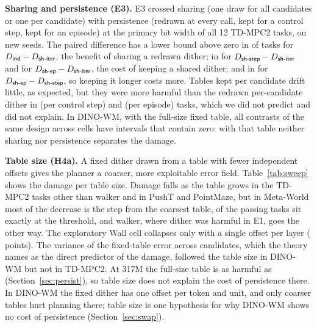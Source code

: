 \textbf{Sharing and persistence (E3).} E3 crossed sharing (one draw for all candidates or one per candidate) with persistence (redrawn at every call, kept for a control step, kept for an episode) at the primary bit width of all 12 TD-MPC2 tasks, on new seeds. The paired difference has a lower bound above zero in  of  tasks for $D_{\textsf{ind}}-D_{\textsf{sh-iter}}$, the benefit of sharing a redrawn dither; in  for $D_{\textsf{sh-step}}-D_{\textsf{sh-iter}}$ and  for $D_{\textsf{sh-ep}}-D_{\textsf{sh-iter}}$, the cost of keeping a shared dither; and in  for $D_{\textsf{sh-ep}}-D_{\textsf{sh-step}}$, so keeping it longer costs more. Tables kept per candidate drift little, as expected, but they were more harmful than the redrawn per-candidate dither in  (per control step) and  (per episode) tasks, which we did not predict and did not explain. In DINO-WM, with the full-size fixed table, all  contrasts of the same design across  cells have intervals that contain zero: with that table neither sharing nor persistence separates the damage.

\textbf{Table size (H4a).} A fixed dither drawn from a table with fewer independent offsets gives the planner a coarser, more exploitable error field. Table~\ref{tab:sweep} shows the damage per table size. Damage falls as the table grows in the TD-MPC2 tasks other than walker and in PushT and PointMaze, but in Meta-World most of the decrease is the step from the coarsest table,  of the  passing tasks sit exactly at the threshold, and walker, where dither was harmful in E1, goes the other way. The exploratory Wall cell collapses only with a single offset per layer ( points). The variance of the fixed-table error across candidates, which the theory names as the direct predictor of the damage, followed the table size in DINO-WM but not in TD-MPC2. At 317M the full-size table is as harmful as \dtm (Section~\ref{sec:persist}), so table size does not explain the cost of persistence there. In DINO-WM the fixed dither has one offset per token and unit, and only coarser tables hurt planning there; table size is one hypothesis for why DINO-WM shows no cost of persistence (Section~\ref{sec:swap}).

